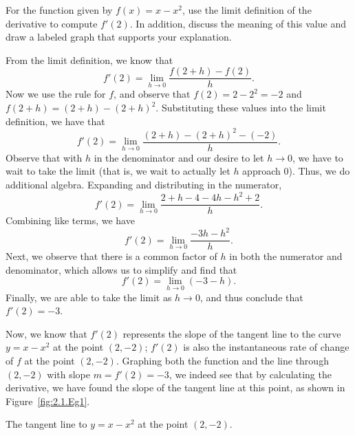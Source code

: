 \begin{example} \label{Ex:2.1.Eg1}
For the function given by $f(x) = x - x^2$, use the limit definition of the derivative to compute $f'(2)$.  In addition, discuss the meaning of this value and draw a labeled graph that supports your explanation. 

\solution From the limit definition, we know that
$$f'(2) = \lim_{h \to 0} \frac{f(2+h)-f(2)}{h}.$$
Now we use the rule for $f$, and observe that $f(2) = 2 - 2^2 = -2$ and $f(2+h) = (2+h) - (2+h)^2.$  Substituting these values into the limit definition, we have that
$$f'(2) = \lim_{h \to 0} \frac{(2+h) - (2+h)^2 -  (-2)}{h}.$$
Observe that with $h$ in the denominator and our desire to let $h \to 0$, we have to wait to take the limit (that is, we wait to actually let $h$ approach $0$).  Thus, we do additional algebra.  Expanding and distributing in the numerator,
$$f'(2) = \lim_{h \to 0} \frac{2+h - 4 - 4h - h^2 + 2}{h}.$$
Combining like terms, we have
$$f'(2) = \lim_{h \to 0} \frac{ -3h - h^2}{h}.$$
Next, we observe that there is a common factor of $h$ in both the numerator and denominator, which allows us to simplify and find that
$$f'(2) = \lim_{h \to 0} (-3-h).$$
Finally, we are able to take the limit as $h \to 0$, and thus conclude that $f'(2) = -3$.

Now, we know that $f'(2)$ represents the slope of the tangent line to the curve $y = x - x^2$ at the point $(2,-2)$; $f'(2)$ is also the instantaneous rate of change of $f$ at the point $(2,-2)$.  Graphing both the function and the line through $(2,-2)$ with slope $m = f'(2) = -3$, we indeed see that by calculating the derivative, we have found the slope of the tangent line at this point, as shown in Figure~\ref{fig:2.1.Eg1}.
\end{example}

\begin{marginfigure}[-6cm]
\caption{The tangent line to $y = x - x^2$ at the point $(2,-2)$.}\label{fig:2.1.Eg1}
\end{marginfigure}